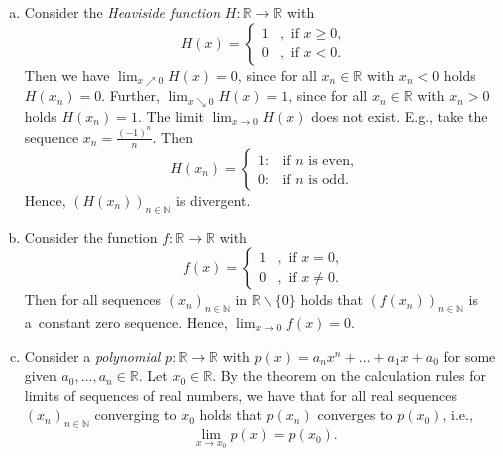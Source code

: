 \begin{example}\label{ex:funclim}
\begin{enumerate}[a)]
 \item Consider the {\em Heaviside function} $H:\mathbb{R}\to\mathbb{R}$ with
\[H(x)=\begin{cases}1&,\text{ if }x\geq 0,\\0&,\text{ if }x<0.\end{cases}\]
Then we have $\lim_{x\nearrow 0}H(x)=0$, since for all $x_n\in\mathbb{R}$ with $x_n<0$ holds $H(x_n)=0$.
Further, $\lim_{x\searrow 0}H(x)=1$, since for all $x_n\in\mathbb{R}$ with $x_n>0$ holds $H(x_n)=1$. The limit $\lim_{x\to 0}H(x)$ does not exist. E.g., take the sequence $x_n=\frac{(-1)^n}n$. Then
\[H(x_n)=\begin{cases}1:&\text{if $n$ is even,}\\0:&\text{if $n$ is odd.}\end{cases}\]
Hence, $(H(x_n))_{n\in\mathbb{N}}$ is divergent.

\item Consider the function $f:\mathbb{R}\to\mathbb{R}$ with
\[f(x)=\begin{cases}1&,\text{ if }x= 0,\\0&,\text{ if }x\neq0.\end{cases}\]
Then for all sequences $(x_n)_{n\in\mathbb{N}}$ in $\mathbb{R}\backslash\{0\}$ holds that $(f(x_n))_{n\in\mathbb{N}}$ is a~constant zero sequence. Hence, $\lim_{x\to 0}f(x)=0$.

 \item Consider a {\em polynomial} $p:\mathbb{R}\to\mathbb{R}$ with $p(x)=a_nx^n+\ldots+a_1x+a_0$ for some given $a_0,\ldots,a_n\in\mathbb{R}$. Let $x_0\in\mathbb{R}$.  
By the theorem on the calculation rules for limits of sequences of real numbers, we have that for
all real sequences $(x_n)_{n\in\mathbb{N}}$ converging to $x_0$ holds that $p(x_n)$ converges to $p(x_0)$, i.e.,
\[\lim_{x\to x_0}p(x)=p(x_0).\]
\end{enumerate}
\end{example}

